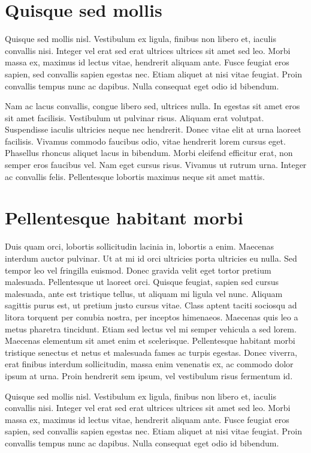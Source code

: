 \documentclass[twocolumn,a4paper,10pt]{article}
\begin{document}
\section{Quisque sed mollis}

Quisque sed mollis nisl. Vestibulum ex ligula, finibus non libero et, iaculis convallis nisi.
Integer vel erat sed erat ultrices ultrices sit amet sed leo. Morbi massa ex, maximus id lectus vitae,
hendrerit aliquam ante. Fusce feugiat eros sapien, sed convallis sapien egestas nec. Etiam aliquet at
nisi vitae feugiat. Proin convallis tempus nunc ac dapibus. Nulla consequat eget odio id bibendum.

Nam ac lacus convallis, congue libero sed, ultrices nulla. In egestas sit amet eros sit amet facilisis.
Vestibulum ut pulvinar risus. Aliquam erat volutpat. Suspendisse iaculis ultricies neque nec hendrerit.
Donec vitae elit at urna laoreet facilisis. Vivamus commodo faucibus odio, vitae hendrerit lorem cursus eget.
Phasellus rhoncus aliquet lacus in bibendum. Morbi eleifend efficitur erat, non semper eros faucibus vel.
Nam eget cursus risus. Vivamus ut rutrum urna. Integer ac convallis felis.
Pellentesque lobortis maximus neque sit amet mattis.

\section{Pellentesque habitant morbi}

Duis quam orci, lobortis sollicitudin lacinia in, lobortis a enim. Maecenas interdum auctor pulvinar.
Ut at mi id orci ultricies porta ultricies eu nulla. Sed tempor leo vel fringilla euismod. Donec gravida velit
eget tortor pretium malesuada. Pellentesque ut laoreet orci. Quisque feugiat, sapien sed cursus malesuada,
ante est tristique tellus, ut aliquam mi ligula vel nunc. Aliquam sagittis purus est, ut pretium justo cursus vitae.
Class aptent taciti sociosqu ad litora torquent per conubia nostra, per inceptos himenaeos.
Maecenas quis leo a metus pharetra tincidunt. Etiam sed lectus vel mi semper vehicula a sed lorem.
Maecenas elementum sit amet enim et scelerisque.
Pellentesque habitant morbi tristique senectus et netus et malesuada fames ac turpis egestas.
Donec viverra, erat finibus interdum sollicitudin, massa enim venenatis ex, ac commodo dolor ipsum at urna.
Proin hendrerit sem ipsum, vel vestibulum risus fermentum id.

Quisque sed mollis nisl. Vestibulum ex ligula, finibus non libero et, iaculis convallis nisi.
Integer vel erat sed erat ultrices ultrices sit amet sed leo. Morbi massa ex, maximus id lectus vitae,
hendrerit aliquam ante. Fusce feugiat eros sapien, sed convallis sapien egestas nec. Etiam aliquet at
nisi vitae feugiat. Proin convallis tempus nunc ac dapibus. Nulla consequat eget odio id bibendum.
\end{document}
